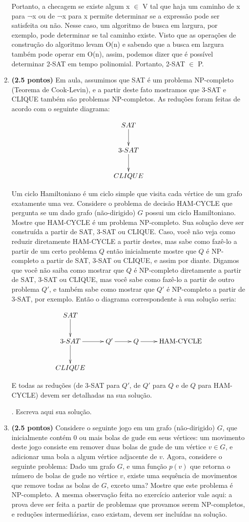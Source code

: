 \documentclass[12pt]{article}
\newcommand{\resposta}[1]{ \noindent {\bf Solução}.{\color{blue} #1}}
\begin{document}
\begin{enumerate}
{    Portanto, a checagem se existe algum x $\in$ V tal que haja um caminho de x para ¬x ou de ¬x para x permite determinar se a expressão pode ser satisfeita ou não. Nesse caso, um algoritmo de busca em largura, por exemplo, pode determinar se tal caminho existe. Visto que as operações de construção do algoritmo levam O(n) e sabendo que a busca em largura também pode operar em O(n), assim, podemos dizer que é possível determinar 2-SAT em tempo polinomial. Portanto, 2-SAT $\in$ P.
  }
  
\item {\bf (2.5 pontos)} Em aula, assumimos que SAT é um problema
  NP-completo (Teorema de Cook-Levin), e a partir deste fato mostramos
  que 3-SAT e CLIQUE também são problemas NP-completos. As reduções
  foram feitas de acordo com o seguinte diagrama:

  $$\xymatrix{
    SAT \ar[d] \\
    3\mbox{-}SAT \ar[d] \\
    CLIQUE 
  }$$
  
  Um ciclo Hamiltoniano é um ciclo simple que visita cada vértice de
  um grafo exatamente uma vez. Considere o problema de decisão
  HAM-CYCLE que pergunta se um dado grafo (não-dirigido) $G$ possui um
  ciclo Hamiltoniano. Mostre que HAM-CYCLE é um problema
  NP-completo. Sua solução deve ser construída a partir de SAT, 3-SAT
  ou CLIQUE. Caso, você não veja como reduzir diretamente HAM-CYCLE a
  partir destes, mas sabe como fazê-lo a partir de um certo problema
  $Q$ então inicialmente mostre que $Q$ é NP-completo a partir de SAT,
  3-SAT ou CLIQUE, e assim por diante. Digamos que você não saiba como
  mostrar que $Q$ é NP-completo diretamente a partir de SAT, 3-SAT ou
  CLIQUE, mas você sabe como fazê-lo a partir de outro problema $Q'$,
  e também sabe como mostrar que $Q'$ é NP-completo a partir de 3-SAT,
  por exemplo. Então o diagrama correspondente à sua solução seria:

$$\xymatrix{
  SAT \ar[d] & & & \\
  3\mbox{-}SAT \ar[d]\ar[r] & Q' \ar[r] & Q \ar[r] & \mbox{HAM-CYCLE}  \\
  CLIQUE & & & 
}$$

E todas as reduções (de 3-SAT para $Q'$, de $Q'$ para $Q$ e de $Q$ para HAM-CYCLE) devem ser detalhadas na sua solução.

\resposta{
    Escreva aqui sua solução.
  }
  
\item {\bf (2.5 pontos)} Considere o seguinte jogo em um grafo
  (não-dirigido) $G$, que inicialmente contém 0 ou mais bolas de gude
  em seus vértices: um movimento deste jogo consiste em remover duas
  bolas de gude de um vértice $v\in G$, e adicionar uma bola a algum
  vértice adjacente de $v$. Agora, considere o seguinte problema: Dado
  um grafo $G$, e uma função $p(v)$ que retorna o número de bolas de
  gude no vértice $v$, existe uma sequência de movimentos que remove
  todas as bolas de $G$, exceto uma? Mostre que este problema é
  NP-completo. A mesma observação feita no exercício anterior vale
  aqui: a prova deve ser feita a partir de problemas que provamos
  serem NP-completos, e reduções intermediárias, caso existam, devem
  ser incluídas na solução.


\end{enumerate}
\end{document}
